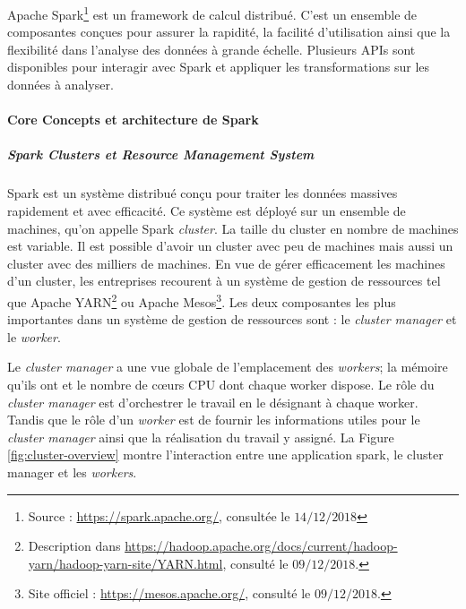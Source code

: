 
Apache Spark\footnote{Source : \url{https://spark.apache.org/}, consultée le $14/12/2018$} 
est un framework de calcul distribué. C'est un ensemble de composantes conçues pour assurer la rapidité, la facilité d'utilisation ainsi que la flexibilité dans l'analyse des données à grande échelle. Plusieurs APIs sont disponibles pour interagir avec Spark et 
 appliquer les transformations sur les données à analyser. 

\paragraph{Core Concepts et architecture de Spark}

\subparagraph{Spark Clusters et Resource Management System}

Spark est un système distribué conçu pour traiter les données massives rapidement et avec efficacité. Ce système est déployé sur un ensemble de machines, qu'on appelle Spark \textit{cluster}. La taille du cluster en nombre de machines est variable. Il est possible d'avoir un cluster avec peu de machines mais aussi un cluster avec des milliers de machines. En vue de gérer efficacement les machines d'un cluster, les entreprises recourent à un système de gestion de ressources tel que Apache YARN\footnote{Description dans \url{https://hadoop.apache.org/docs/current/hadoop-yarn/hadoop-yarn-site/YARN.html}, consulté le $09/12/2018$.} ou Apache Mesos\footnote{Site officiel : \url{https://mesos.apache.org/}, consulté le $09/12/2018$.}. Les deux composantes les plus importantes dans un système de gestion de ressources sont : le \textit{cluster manager} et le \textit{worker}.

Le \textit{cluster manager} a une vue globale de l'emplacement des \textit{workers}; la mémoire qu'ils ont et le nombre de c\oe{}urs CPU dont chaque worker dispose. Le rôle du \textit{cluster manager} est d'orchestrer le travail en le désignant à chaque worker. Tandis que le rôle d'un \textit{worker} est de fournir les informations utiles pour le \textit{cluster manager} ainsi que la réalisation du travail y assigné. La Figure \ref{fig:cluster-overview} montre l'interaction entre une application spark, le cluster manager et les \textit{workers}.


